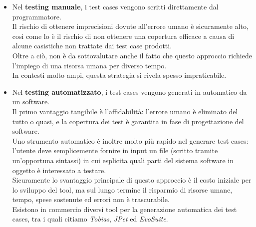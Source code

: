 \begin{itemize}

\item Nel \textbf{testing manuale}, i test cases vengono scritti direttamente dal programmatore.\\
Il rischio di ottenere imprecisioni dovute all'errore umano è sicuramente alto, così come lo è il rischio di non ottenere una copertura efficace a causa di alcune casistiche non trattate dai test case prodotti.\\ 
Oltre a ciò, non è da sottovalutare anche il fatto che questo approccio richiede l'impiego di una risorsa umana per diverso tempo.\\
In contesti molto ampi, questa strategia si rivela spesso impraticabile.\\

\item Nel \textbf{testing automatizzato}, i test cases vengono generati in automatico da un software.\\
Il primo vantaggio tangibile è l'affidabilità: l'errore umano è eliminato del tutto o quasi, e la copertura dei test è garantita in fase di progettazione del software.\\
Uno strumento automatico è inoltre molto più rapido nel generare test cases: l'utente deve semplicemente fornire in input un file (scritto tramite un'opportuna sintassi) in cui esplicita quali parti del sistema software in oggetto è interessato a testare.\\
Sicuramente lo svantaggio principale di questo approccio è il costo iniziale per lo sviluppo del tool, ma sul lungo termine il risparmio di risorse umane, tempo, spese sostenute ed errori non è trascurabile.\\
Esistono in commercio diversi tool per la generazione automatica dei test cases, tra i quali citiamo \emph{Tobias}, \emph{JPet} ed \emph{EvoSuite}.\\

\end{itemize}


